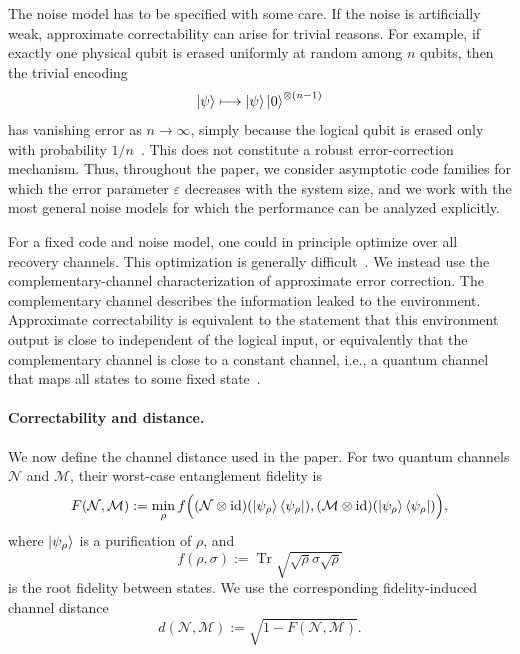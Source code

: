 \documentclass[10pt,twocolumn,superscriptaddress,aps,amsmath,amssymb,citeautoscript,floatfix,prx,longbibliography]{revtex4-2}
\theoremstyle{plain}
\theoremstyle{plain}
\theoremstyle{plain}
\theoremstyle{plain}
\theoremstyle{plain}
\theoremstyle{plain}
\begin{document}
The noise model has to be specified with some care. If the noise is artificially weak, approximate correctability can arise for trivial reasons. For example, if exactly one physical qubit is erased uniformly at random among $n$ qubits, then the trivial encoding
$$
\ket\psi
\longmapsto
\ket\psi\ket 0^{\otimes(n-1)}
$$
has vanishing error as $n\to\infty$, simply because the logical qubit is erased only with probability $1/n$~\cite{Yi2024}. This does not constitute a robust error-correction mechanism. Thus, throughout the paper, we consider asymptotic code families for which the error parameter $\varepsilon$ decreases with the system size, and we work with the most general noise models for which the performance can be analyzed explicitly.

For a fixed code and noise model, one could in principle optimize over all recovery channels. This optimization is generally difficult~\cite{PhysRevA.75.012338}. We instead use the complementary-channel characterization of approximate error correction. The complementary channel describes the information leaked to the environment. Approximate correctability is equivalent to the statement that this environment output is close to independent of the logical input, or equivalently that the complementary channel is close to a constant channel, i.e., a quantum channel that maps all states to some fixed state~\cite{Beny2010, Faist2020}.

\paragraph{Correctability and distance.}

We now define the channel distance used in the paper. For two quantum channels $\mathcal N$ and $\mathcal M$, their worst-case entanglement fidelity is
$$
\begin{aligned}
F(\mathcal N,\mathcal M)
:=
\min_\rho
f\Big(
(\mathcal N\otimes\mathrm{id})
(\ket{\psi_\rho}\bra{\psi_\rho}),
(\mathcal M\otimes\mathrm{id})
(\ket{\psi_\rho}\bra{\psi_\rho})
\Big),
\end{aligned}
$$
where $\ket{\psi_\rho}$ is a purification of $\rho$, and
$$
f(\rho,\sigma)
:=
\operatorname{Tr}
\sqrt{\sqrt\rho\sigma\sqrt\rho}
$$
is the root fidelity between states. We use the corresponding fidelity-induced channel distance
\begin{equation}\label{eq:distance_def}
d(\mathcal N,\mathcal M)
:=
\sqrt{1-F(\mathcal N,\mathcal M)} .
\end{equation}
\end{document}
